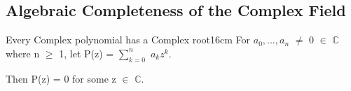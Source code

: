     \vspace{0.5cm}





\subsection{ Algebraic Completeness of the Complex Field }

    \begin{wtheorem}{Every Complex polynomial has a Complex root}{16cm}
        For $a_0,...,a_n$ $\not =$ 0 $\in$ $\mathbb{C}$ where n $\geq$ 1,
        let P(z) = $\sum_{k=0}^n$ $a_k z^k$.

        Then P(z) = 0 for some z $\in$ $\mathbb{C}$.
    \end{wtheorem}


